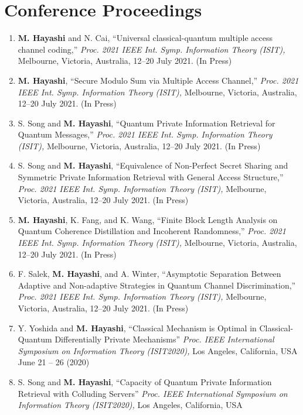 \documentclass[a4paper,12pt,oneside]{article}
\begin{document}
\section{Conference Proceedings}
\begin{enumerate}


\item
\textbf{M. Hayashi} and N. Cai, 
``Universal classical-quantum multiple access channel
coding,''
{\em Proc. 2021 IEEE Int. Symp. Information Theory (ISIT),} 
Melbourne, Victoria, Australia, 12–20 July 2021. (In Press)

\item
\textbf{M. Hayashi}, 
``Secure Modulo Sum via Multiple Access Channel,''
{\em Proc. 2021 IEEE Int. Symp. Information Theory (ISIT),} 
Melbourne, Victoria, Australia, 12–20 July 2021. (In Press)

\item
S. Song and \textbf{M. Hayashi}, 
``Quantum Private Information Retrieval for Quantum Messages,''
{\em Proc. 2021 IEEE Int. Symp. Information Theory (ISIT),}
Melbourne, Victoria, Australia, 12–20 July 2021. (In Press)

\item
S. Song and \textbf{M. Hayashi}, 
``Equivalence of Non-Perfect Secret Sharing and Symmetric Private Information Retrieval with General Access Structure,''
{\em Proc. 2021 IEEE Int. Symp. Information Theory (ISIT),}
Melbourne, Victoria, Australia, 12–20 July 2021. (In Press)

\item
\textbf{M. Hayashi}, K. Fang, and K. Wang,
``Finite Block Length Analysis on Quantum
Coherence Distillation and Incoherent Randomness,''
{\em Proc. 2021 IEEE Int. Symp. Information Theory (ISIT),}
Melbourne, Victoria, Australia, 12–20 July 2021. (In Press)

\item
F. Salek, \textbf{M. Hayashi}, and A. Winter, 
``Asymptotic Separation Between Adaptive and Non-adaptive Strategies in Quantum Channel Discrimination,''
{\em Proc. 2021 IEEE Int. Symp. Information Theory (ISIT),} 
Melbourne, Victoria, Australia, 12–20 July 2021. (In Press)

\item    
Y. Yoshida and \textbf{M. Hayashi}, 
``Classical Mechanism is Optimal in Classical-Quantum Differentially Private Mechanisms''
{\em Proc. IEEE International Symposium on Information Theory (ISIT2020),} 
Los Angeles, California, USA
June 21 -- 26 (2020)

\item
S. Song and \textbf{M. Hayashi}, 
``Capacity of Quantum Private Information Retrieval with Colluding Servers''
{\em Proc. IEEE International Symposium on Information Theory (ISIT2020),} 
Los Angeles, California, USA


\end{enumerate}
\end{document}

